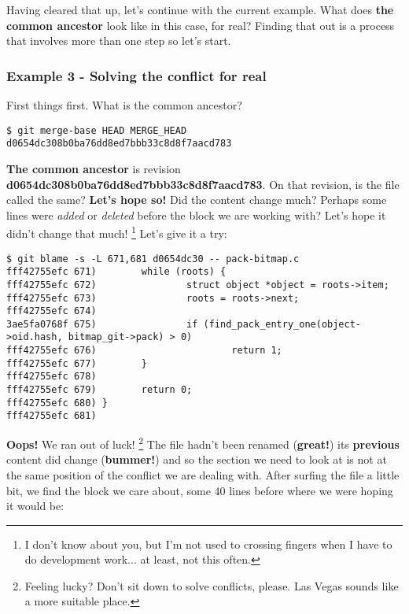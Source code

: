 Having cleared that up, let's continue with the current example. What does {\bf the common ancestor} look like in this case,
for real? Finding that out is a process that involves more than one step so let's start.

\subsubsection{Example 3 - Solving the conflict for real}
First things first. What is the common ancestor?

\begin{lstlisting}[style=console_style, caption={\bf example 3} - finging common ancestor]
$ git merge-base HEAD MERGE_HEAD
d0654dc308b0ba76dd8ed7bbb33c8d8f7aacd783
\end{lstlisting}

{\bf The common ancestor} is revision {\bf d0654dc308b0ba76dd8ed7bbb33c8d8f7aacd783}. On that revision, is the file called the same?
{\bf Let's hope so!} Did the content change much? Perhaps some lines were {\it added} or {\it deleted} before the block we are working
with? Let's hope it didn't change that much! \footnote {I don't know about you, but I'm not used to crossing fingers
when I have to do development work... at least, not this often.} Let's give it a try:

\begin{lstlisting}[style=console_style, basicstyle=\small, caption={\bf example 3} - checking ancestor code]
$ git blame -s -L 671,681 d0654dc30 -- pack-bitmap.c
fff42755efc 671)        while (roots) {
fff42755efc 672)                struct object *object = roots->item;
fff42755efc 673)                roots = roots->next;
fff42755efc 674) 
3ae5fa0768f 675)                if (find_pack_entry_one(object->oid.hash, bitmap_git->pack) > 0)
fff42755efc 676)                        return 1;
fff42755efc 677)        }
fff42755efc 678) 
fff42755efc 679)        return 0;
fff42755efc 680) }
fff42755efc 681)
\end{lstlisting}

{\bf Oops!} We ran out of luck! \footnote{Feeling lucky? Don't sit down to solve conflicts, please. Las Vegas sounds like a more
suitable place.}  The file hadn't been renamed ({\bf great!}) its {\bf previous} content did change ({\bf bummer!}) and so the
section we need to look at is not at the same position of the conflict we are dealing with. After surfing the file a little bit,
we find the block we care about, some 40 lines before where we were hoping it would be:

